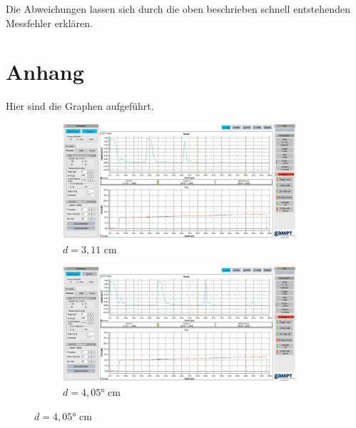 Die Abweichungen lassen sich durch die oben beschrieben schnell entstehenden Messfehler erklären.




\section{Anhang}

Hier sind die Graphen aufgeführt.

\begin{figure}
  \centering
  \begin{subfigure}{0.7\textwidth}
    \centering
    \includegraphics[width=0.95\textwidth]{screens/311.jpg}
    \caption{$d = 3,11$ cm}
    \label{fig:0-deg}
  \end{subfigure}

  \begin{subfigure}{0.7\textwidth}
    \centering
    \includegraphics[width=0.95\textwidth]{screens/405.jpg}
    \caption{$d = 4,05°$ cm}
    \label{fig:45-deg}
  \end{subfigure}


\end{figure}
